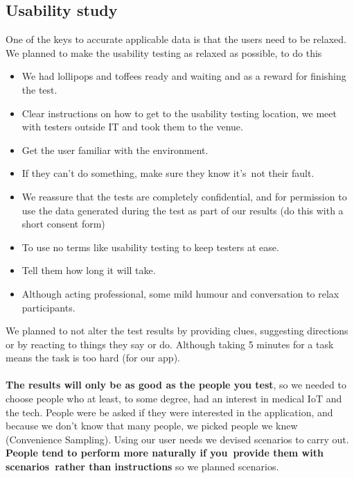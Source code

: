 \documentclass[12pt]{article}
\begin{document}
{	\subsection{Usability study}
	One of the keys to accurate applicable data is that the users need to be relaxed. We planned to make the usability testing as relaxed as possible, to do this
		\begin{itemize}
		\item We had lollipops and toffees ready and waiting and as a reward for finishing the test. 
		\item Clear instructions on how to get to the usability testing location, we meet with testers outside IT and took them to the venue. 
		\item Get the user familiar with the environment.
		\item If they can't do something, make sure they know it's not their fault. 
		\item We reassure that the tests are completely confidential, and for permission to use the data generated during the test as part of our results (do this with a short consent form) 
		\item To use no terms like usability testing to keep testers at ease.
		\item Tell them how long it will take.
		\item Although acting professional, some mild humour and conversation to relax participants.
		\end{itemize} 
		We planned to not alter the test results by providing clues, suggesting directions or by reacting to things they say or do. Although taking 5 minutes for a task means the task is too hard (for our app). \\ \\
		\textbf{The results will only be as good as the people you test}, so we needed to choose people who at least, to some degree, had an interest in medical IoT and the tech. People were be asked if they were interested in the application, and because we don’t know that many people, we picked people we knew (Convenience Sampling). Using our user needs we devised scenarios to carry out. \textbf{People tend to perform more naturally if you provide them with scenarios rather than instructions} so we planned scenarios.
}
\end{document}
